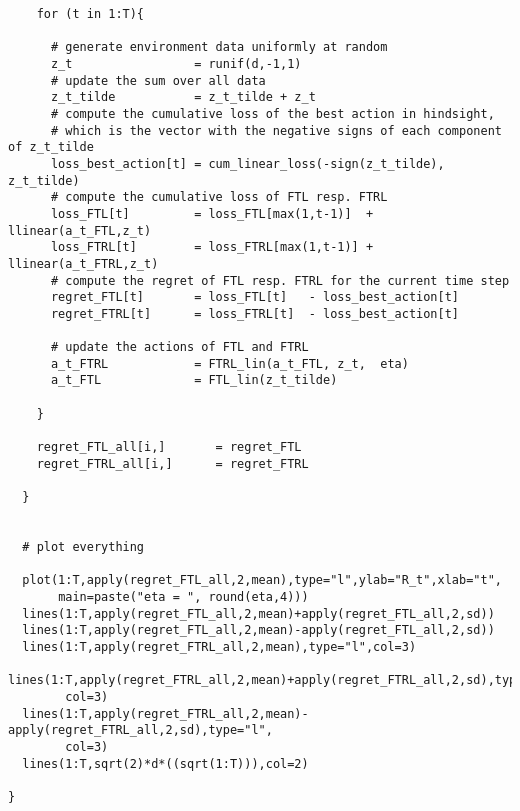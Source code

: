 \documentclass[a4paper]{article}
\begin{document}
{\begin{lstlisting}
    for (t in 1:T){
      
      # generate environment data uniformly at random
      z_t                 = runif(d,-1,1)
      # update the sum over all data
      z_t_tilde           = z_t_tilde + z_t
      # compute the cumulative loss of the best action in hindsight, 
      # which is the vector with the negative signs of each component of z_t_tilde 
      loss_best_action[t] = cum_linear_loss(-sign(z_t_tilde), z_t_tilde)
      # compute the cumulative loss of FTL resp. FTRL
      loss_FTL[t]         = loss_FTL[max(1,t-1)]  + llinear(a_t_FTL,z_t)  
      loss_FTRL[t]        = loss_FTRL[max(1,t-1)] + llinear(a_t_FTRL,z_t)
      # compute the regret of FTL resp. FTRL for the current time step
      regret_FTL[t]       = loss_FTL[t]   - loss_best_action[t]
      regret_FTRL[t]      = loss_FTRL[t]  - loss_best_action[t]
      
      # update the actions of FTL and FTRL        
      a_t_FTRL            = FTRL_lin(a_t_FTL, z_t,  eta) 
      a_t_FTL             = FTL_lin(z_t_tilde) 
      
    }
    
    regret_FTL_all[i,]       = regret_FTL
    regret_FTRL_all[i,]      = regret_FTRL
    
  }
  
  
  # plot everything 
  
  plot(1:T,apply(regret_FTL_all,2,mean),type="l",ylab="R_t",xlab="t",
       main=paste("eta = ", round(eta,4)))
  lines(1:T,apply(regret_FTL_all,2,mean)+apply(regret_FTL_all,2,sd))
  lines(1:T,apply(regret_FTL_all,2,mean)-apply(regret_FTL_all,2,sd))
  lines(1:T,apply(regret_FTRL_all,2,mean),type="l",col=3)
  lines(1:T,apply(regret_FTRL_all,2,mean)+apply(regret_FTRL_all,2,sd),type="l",
        col=3)
  lines(1:T,apply(regret_FTRL_all,2,mean)-apply(regret_FTRL_all,2,sd),type="l",
        col=3)
  lines(1:T,sqrt(2)*d*((sqrt(1:T))),col=2)
  
}

\end{lstlisting}

}
\end{document}
